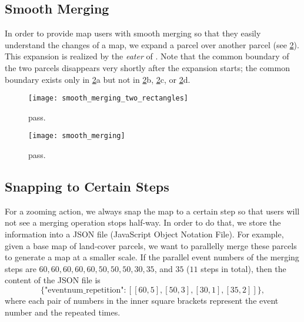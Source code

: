 \documentclass[ijgi,article,submit,moreauthors,pdftex]{Definitions/mdpi}
\begin{document}
%
%



\subsection{Smooth Merging}

In order to provide map users with smooth merging
so that they easily understand the changes of a map,
we expand a parcel over another parcel
(see \fig\ref{fig:smooth_merging}).
This expansion is realized by the \emph{eater} of 
\citet{Suba2014Merge}.
Note that the common boundary of the two parcels disappears
very shortly after the expansion starts;
the common boundary exists only in \fig\ref{fig:smooth_merging}a but not in
\fig\ref{fig:smooth_merging}b,
\fig\ref{fig:smooth_merging}c, or
\fig\ref{fig:smooth_merging}d.

\begin{figure}[tb]
\centering
\texttt{[image: smooth\_merging\_two\_rectangles]}
\caption{pass.}
\label{fig:smooth_merging_two_rectangles}
\end{figure}

\begin{figure}[tb]
\centering
\texttt{[image: smooth\_merging]}
\caption{pass.}
\label{fig:smooth_merging}
\end{figure}


\subsection{Snapping to Certain Steps}
\label{sec:snap}

For a zooming action, 
we always snap the map to a certain step
so that users will not see a merging operation stops half-way.
In order to do that, we store the information into 
a JSON file (JavaScript Object Notation File).
For example, given a base map of land-cover parcels,
we want to parallelly merge these parcels to generate a map
at a smaller scale.
If the parallel event numbers of the merging steps are 
$60, 60, 60, 60, 60, 50, 50, 50, 30, 35$, and $35$ ($11$ steps in total),
then the content of the JSON file is
$$\{\textrm{"eventnum\_repetition"}: [[60, 5], [50, 3], [30, 1], [35, 2]]\},$$
where each pair of numbers in the inner square brackets 
represent the event number and the repeated times.
\end{document}
